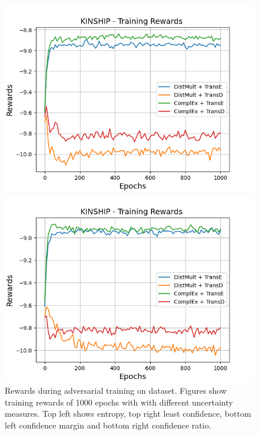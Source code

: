 \begin{figure}[H]
\begin{minipage}{.5\textwidth}
    \end{minipage}
    \begin{minipage}{.5\textwidth}
      \centering
      \includegraphics[width=0.9\linewidth]{figures/results/gan_train/not_pretrained/uncertainty/max_distribution/confidence_margin/kinship/1k_epochs/uncertainty_kinship_rew.png}
    \end{minipage}%
    \begin{minipage}{.5\textwidth}
      \centering
      \includegraphics[width=0.9\linewidth]{figures/results/gan_train/not_pretrained/uncertainty/max_distribution/confidence_ratio/kinship/1k_epochs/uncertainty_kinship_rew.png}
    \end{minipage}%
    \caption{Rewards during adversarial training on \kinship dataset. 
    Figures show training rewards of 1000 epochs with \ussoftmax with different uncertainty measures.
    Top left shows entropy, top right least confidence, 
    bottom left confidence margin and bottom right confidence ratio.}
    \label{fig:advtrain_metrics_kinship_rew}
\end{figure}